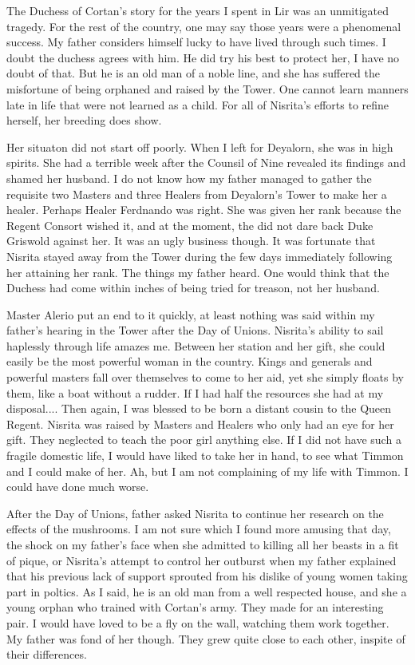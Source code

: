 \documentclass{article}
\begin{document}
The Duchess of Cortan's story for the years I spent in Lir was an unmitigated tragedy. For the rest of the country, one may say those years were a phenomenal success. My father considers himself lucky to have lived through such times. I doubt the duchess agrees with him. He did try his best to protect her, I have no doubt of that. But he is an old man of a noble line, and she has suffered the misfortune of being orphaned and raised by the Tower. One cannot learn manners late in life that were not learned as a child. For all of Nisrita's efforts to refine herself, her breeding does show.

Her situaton did not start off poorly. When I left for Deyalorn, she was in high spirits. She had a terrible week after the Counsil of Nine revealed its findings and shamed her husband. I do not know how my father managed to gather the requisite two Masters and three Healers from Deyalorn's Tower to make her a healer. Perhaps Healer Ferdnando was right. She was given her rank because the Regent Consort wished it, and at the moment, the did not dare back Duke Griswold against her. It was an ugly business though. It was fortunate that Nisrita stayed away from the Tower during the few days immediately following her attaining her rank. The things my father heard. One would think that the Duchess had come within inches of being tried for treason, not her husband. 

Master Alerio put an end to it quickly, at least nothing was said within my father's hearing in the Tower after the Day of Unions. Nisrita's ability to sail haplessly through life amazes me. Between her station and her gift, she could easily be the most powerful woman in the country. Kings and generals and powerful masters fall over themselves to come to her aid, yet she simply floats by them, like a boat without a rudder. If I had half the resources she had at my disposal.... Then again, I was blessed to be born a distant cousin to the Queen Regent. Nisrita was raised by Masters and Healers who only had an eye for her gift. They neglected to teach the poor girl anything else. If I did not have such a fragile domestic life, I would have liked to take her in hand, to see what Timmon and I could make of her. Ah, but I am not complaining of my life with Timmon. I could have done much worse.

After the Day of Unions, father asked Nisrita to continue her research on the effects of the mushrooms. I am not sure which I found more amusing that day, the shock on my father's face when she admitted to killing all her beasts in a fit of pique, or Nisrita's attempt to control her outburst when my father explained that his previous lack of support sprouted from his  dislike of young women taking part in poltics. As I said, he is an old man from a well respected house, and she a young orphan who trained with Cortan's army. They made for an interesting pair. I would have loved to be a fly on the wall, watching them work together. My father was fond of her though. They grew quite close to each other, inspite of their differences.
\end{document}
